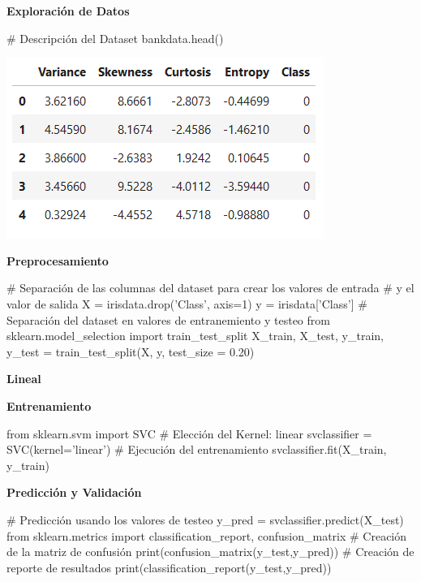 \documentclass[paper=a4, fontsize=11pt]{scrartcl}
\numberwithin{equation}{section}		%
\numberwithin{figure}{section}			%
\numberwithin{table}{section}				%
\begin{document}
\begin{enumerate}
    \textbf{Exploración de Datos}
    
    \begin{python}
    # Descripción del Dataset
    bankdata.head()
    \end{python}
    
    \includegraphics[scale=0.8]{df2_head}
    
    \textbf{Preprocesamiento}
    
    \begin{python}
    # Separación de las columnas del dataset para crear los valores de entrada
    # y el valor de salida
    X = irisdata.drop('Class', axis=1)  
    y = irisdata['Class'] 
    # Separación del dataset en valores de entranemiento y testeo
    from sklearn.model_selection import train_test_split  
    X_train, X_test, y_train, y_test = train_test_split(X, y, test_size = 0.20) 
    \end{python}
    
    \textbf{Lineal}
    
    \textbf{Entrenamiento}
    
    \begin{python}
    from sklearn.svm import SVC
    # Elección del Kernel: linear
    svclassifier = SVC(kernel='linear')
    # Ejecución del entrenamiento
    svclassifier.fit(X_train, y_train)
    \end{python}
    
    \textbf{Predicción y Validación}
    
    \begin{python}
    # Predicción usando los valores de testeo
    y_pred = svclassifier.predict(X_test)
    from sklearn.metrics import classification_report, confusion_matrix
    # Creación de la matriz de confusión
    print(confusion_matrix(y_test,y_pred))
    # Creación de reporte de resultados
    print(classification_report(y_test,y_pred))
    \end{python}
    

\end{enumerate}
\end{document}
